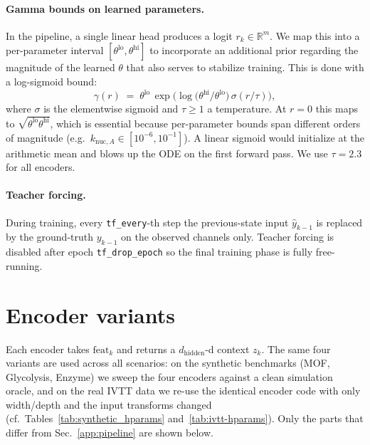 \paragraph{Gamma bounds on learned parameters.} In the pipeline, a single linear head produces a
logit $r_k \in \mathbb{R}^{m}$. We map this into a per-parameter interval $[\theta^{\mathrm{lo}}, \theta^{\mathrm{hi}}]$ to incorporate an additional prior regarding the magnitude of the learned $\theta$ that also serves to stabilize training. This is done with a log-sigmoid bound:
\begin{equation}
\gamma(r) \;=\; \theta^{\mathrm{lo}} \,\exp\!\Big(\log\!\big(\theta^{\mathrm{hi}}/\theta^{\mathrm{lo}}\big)\,\sigma(r/\tau)\Big),
\label{eq:loggamma}
\end{equation}
where $\sigma$ is the elementwise sigmoid and $\tau\!\geq\!1$ a temperature.
At $r\!=\!0$ this maps to $\sqrt{\theta^{\mathrm{lo}}\theta^{\mathrm{hi}}}$,
which is essential because per-parameter bounds span different orders of
magnitude (e.g.\ $k_{\mathrm{nuc},A}\in[10^{-6},10^{-1}]$). A linear sigmoid would initialize at the arithmetic mean and blows up the ODE on the first
forward pass. We use $\tau\!=\!2.3$ for all encoders.

\paragraph{Teacher forcing.} During training, every \texttt{tf\_every}-th step
the previous-state input $\hat{y}_{k-1}$ is replaced by the ground-truth
$y_{k-1}$ on the observed channels only. Teacher forcing is disabled after
epoch \texttt{tf\_drop\_epoch} so the final training phase is fully
free-running.

\section{Encoder variants}
\label{app:encoders}

Each encoder takes $\mathrm{feat}_k$ and returns a $d_{\mathrm{hidden}}$-d
context $z_k$. The same four variants are used across all scenarios:
on the synthetic benchmarks (MOF, Glycolysis, Enzyme) we sweep the four
encoders against a clean simulation oracle, and on the real IVTT data we
re-use the identical encoder code with only width/depth and the input
transforms changed (cf.\ Tables~\ref{tab:synthetic_hparams}
and~\ref{tab:ivtt-hparams}). Only the parts that differ from
Sec.~\ref{app:pipeline} are shown below.

